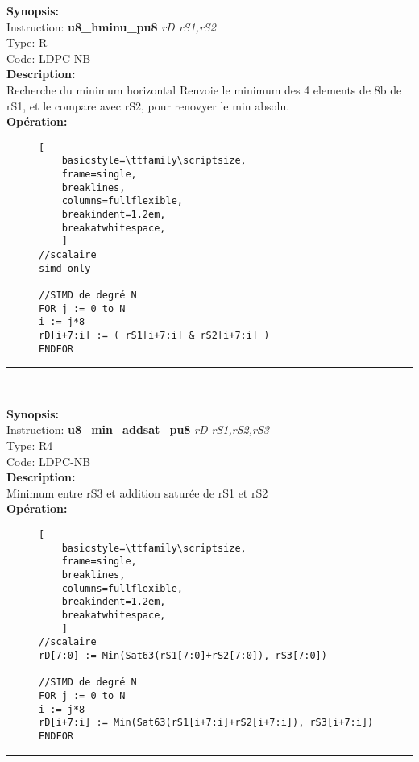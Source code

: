 {\scriptsize
\textbf{Synopsis:}\\
Instruction: \textbf{u8\_hminu\_pu8 } \textit{rD rS1,rS2}\\
Type: R\\
Code: LDPC-NB\\
\textbf{Description:}\\
Recherche du minimum horizontal
Renvoie le minimum des 4 elements de 8b de rS1, et le compare avec rS2, pour renovyer le min absolu. \\
\textbf{Opération:}\\
    \begin{figure}[H]
    \begin{lstlisting}[
    basicstyle=\ttfamily\scriptsize,
    frame=single,
    breaklines,
    columns=fullflexible,
    breakindent=1.2em,
    breakatwhitespace,
    ]
//scalaire
simd only 
    
//SIMD de degré N
FOR j := 0 to N  
i := j*8  
rD[i+7:i] := ( rS1[i+7:i] & rS2[i+7:i] )  
ENDFOR
\end{lstlisting}
\end{figure}
}
\rule{8cm}{0.4pt}\\
{\scriptsize
\textbf{Synopsis:}\\
Instruction: \textbf{u8\_min\_addsat\_pu8 } \textit{rD rS1,rS2,rS3}\\
Type: R4\\
Code: LDPC-NB\\
\textbf{Description:}\\
Minimum entre rS3 et
addition saturée de rS1 et rS2 \\
\textbf{Opération:}\\
    \begin{figure}[H]
    \begin{lstlisting}[
    basicstyle=\ttfamily\scriptsize,
    frame=single,
    breaklines,
    columns=fullflexible,
    breakindent=1.2em,
    breakatwhitespace,
    ]
//scalaire
rD[7:0] := Min(Sat63(rS1[7:0]+rS2[7:0]), rS3[7:0])
    
//SIMD de degré N
FOR j := 0 to N  
i := j*8  
rD[i+7:i] := Min(Sat63(rS1[i+7:i]+rS2[i+7:i]), rS3[i+7:i])
ENDFOR
\end{lstlisting}
\end{figure}
}
\rule{8cm}{0.4pt}\\
